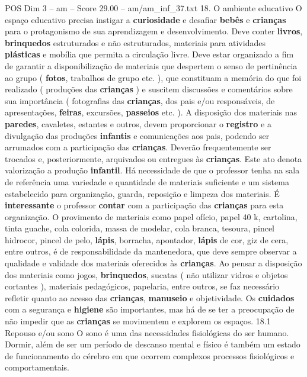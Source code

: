 \begin{textsample}{POS Dim 3 – am – Score 29.00 – am/am\_inf\_37.txt}  \label{ex:f3_pos_036}
18.
O ambiente educativo O espaço educativo precisa instigar a \textbf{curiosidade} e desafiar \textbf{bebês} e \textbf{crianças} para o protagonismo de sua aprendizagem e desenvolvimento.
Deve conter \textbf{livros}, \textbf{brinquedos} estruturados e não estruturados, materiais para atividades \textbf{plásticas} e mobília que permita a circulação livre.
Deve estar organizado a fim de garantir a disponibilização de materiais que despertem o senso de pertinência ao grupo ( \textbf{fotos}, trabalhos de grupo etc. ), que constituam a memória do que foi realizado ( produções das \textbf{crianças} ) e suscitem discussões e comentários sobre sua importância ( fotografias das \textbf{crianças}, dos pais e/ou responsáveis, de apresentações, \textbf{feiras}, excursões, \textbf{passeios} etc. ).
A disposição dos materiais nas \textbf{paredes}, cavaletes, estantes e outros, devem proporcionar o \textbf{registro} e a divulgação das produções \textbf{infantis} e comunicações aos pais, podendo ser arrumados com a participação das \textbf{crianças}.
Deverão frequentemente ser trocados e, posteriormente, arquivados ou entregues às \textbf{crianças}.
Este ato denota valorização a produção \textbf{infantil}.
Há necessidade de que o professor tenha na sala de referência uma variedade e quantidade de materiais suficiente e um sistema estabelecido para organização, guarda, reposição e limpeza dos materiais.
É \textbf{interessante} o professor \textbf{contar} com a participação das \textbf{crianças} para esta organização.
O provimento de materiais como papel ofício, papel 40 k, cartolina, tinta guache, cola colorida, massa de modelar, cola branca, tesoura, pincel hidrocor, pincel de pelo, \textbf{lápis}, borracha, apontador, \textbf{lápis} de cor, giz de cera, entre outros, é de responsabilidade da mantenedora, que deve sempre observar a qualidade e validade dos materiais oferecidos às \textbf{crianças}.
Ao pensar a disposição dos materiais como jogos, \textbf{brinquedos}, sucatas ( não utilizar vidros e objetos cortantes ), materiais pedagógicos, papelaria, entre outros, se faz necessário refletir quanto ao acesso das \textbf{crianças}, \textbf{manuseio} e objetividade.
Os \textbf{cuidados} com a segurança e \textbf{higiene} são importantes, mas há de se ter a preocupação de não impedir que as \textbf{crianças} se movimentem e explorem os espaços. 18.1 Repouso e/ou sono O sono é uma das necessidades fisiológicas do ser humano.
Dormir, além de ser um período de descanso mental e físico é também um estado de funcionamento do cérebro em que ocorrem complexos processos fisiológicos e comportamentais.

\end{textsample}
